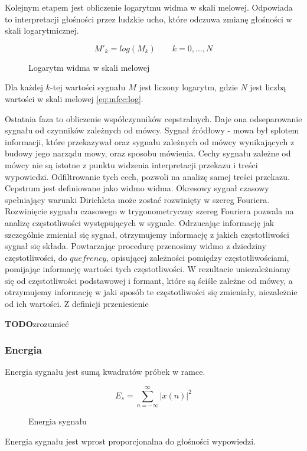 \documentclass[a4paper,12pt,twoside,openany]{report}
\newcommand{\TODO}{\textbf{TODO}}
\begin{document}
Kolejnym etapem jest obliczenie logarytmu widma w skali melowej.
Odpowiada to interpretacji głośności przez ludzkie ucho,
które odczuwa zmianę głośności w skali logarytmicznej.
\begin{figure}[h]
	\begin{equation}
		M'_k=log(M_k)\qquad k=0, \dots, N
		\label{eq:mfcc:log}
	\end{equation}
	\caption{Logarytm widma w skali melowej}
\end{figure}
Dla każdej $k$-tej wartości sygnału $M$ jest liczony logarytm, gdzie $N$ jest liczbą wartości w skali melowej \ref{eq:mfcc:log}.

Ostatnia faza to obliczenie współczynników cepstralnych.
Daje ona odseparowanie sygnału od czynników zależnych od mówcy.
Sygnał źródłowy - mowa był splotem informacji,
które przekazywał oraz sygnału zależnych od mówcy wynikających z budowy jego narządu mowy, oraz sposobu mówienia.
Cechy sygnału zależne od mówcy nie są istotne z punktu widzenia interpretacji przekazu i treści wypowiedzi.
Odfiltrowanie tych cech, pozwoli na analizę samej treści przekazu.
Cepstrum jest definiowane jako widmo widma.
Okresowy sygnał czasowy spełniający warunki Dirichleta może zostać rozwinięty w szereg Fouriera.
Rozwinięcie sygnału czasowego w trygonometryczny szereg Fouriera pozwala na analizę częstotliwości występujących w sygnale.
Odrzucając informację jak szczególnie zmieniał się sygnał, otrzymujemy informację z jakich częstotliwości sygnał się składa.
Powtarzając procedurę przenosimy widmo z dziedziny częstotliwości, do $quefrency$, opisującej zależności pomiędzy częstotliwościami,
pomijając informację wartości tych częstotliwości. 
W rezultacie uniezależniamy się od częstotliwości podstawowej i formant, które są ściśle zależne od mówcy,
a otrzymujemy informację w jaki sposób te częstotliwości się zmieniały, niezależnie od ich wartości.
Z definicji przeniesienie 

\TODO zrozumieć

\subsubsection{Energia}
Energia sygnału jest sumą kwadratów próbek w ramce.
\begin{figure}[h]
	\begin{equation}
		E_{s}=\sum _{n=-\infty }^{\infty }{|x(n)|^{2}}
		\label{eq:energy}
	\end{equation}
	\caption{Energia sygnału}
\end{figure}
Energia sygnału jest wprost proporcjonalna do głośności wypowiedzi.
\end{document}
